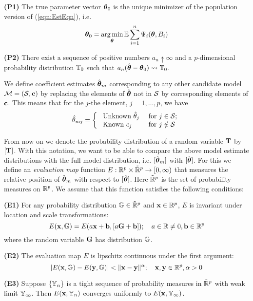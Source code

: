 \noindent\textbf{(P1)} The true parameter vector ${\boldsymbol{\theta}}_0$ is the unique minimizer of the population version of (\ref{eqn:EstEqn}), i.e.
%
\begin{align*}
{\boldsymbol{\theta}}_0 = \operatorname*{arg\,min}_{ {\boldsymbol{\theta}} } {\mathbb{E}} \sum_{i=1}^n \Psi_i ({\boldsymbol{\theta}}, B_i)
\end{align*}

\noindent\textbf{(P2)} There exist a sequence of positive numbers $a_n \uparrow \infty$ and a $p$-dimensional probability distribution ${\mathbb{T}}_0$ such that $a_n (\hat {{\boldsymbol{\theta}}} - {\boldsymbol{\theta}}_0) \leadsto {\mathbb{T}}_0$.
%

\noindent We define coefficient estimates $\hat {{\boldsymbol{\theta}}}_m$ corresponding to any other candidate model ${\cal{M}} = ({\cal{S}}, {\bf{c}})$ by replacing the elements of $\hat {{\boldsymbol{\theta}}}$ not in ${\cal{S}}$ by corresponding elements of ${\bf{c}}$. This means that for the $j$-the element, $j = 1, \ldots, p$, we have
%
$$
\hat \theta_{m j} = \left\{ \begin{array}{ll}
\text{ Unknown } \hat \theta_{j} & \text{ for } 
			j \in {\cal{S}}; \\
\text{ Known } c_{j} & \text{ for } j \notin {\cal{S}}
\end{array}
\right.
$$
%

From now on we denote the probability distribution of a random variable ${\mathbf{T}}$ by $[{\mathbf{T}}]$. With this notation, we want to be able to compare the above model estimate distributions with the full model distribution, i.e. $[\hat {{\boldsymbol{\theta}}}_m]$ with  $[\hat{{\boldsymbol{\theta}}}]$. For this we define an \textit{evaluation map} function $E: {\mathbb{R}}^p \times \tilde {{\mathbb{R}}}^p \rightarrow [0, \infty)$ that measures the relative position of $\hat {{\boldsymbol{\theta}}}_m$ with respect to $[\hat {{\boldsymbol{\theta}}}]$. Here $\tilde {{\mathbb{R}}}^p$ is the set of probability measures on ${\mathbb{R}}^p$. We assume that this function satisfies the following conditions:

\noindent\textbf{(E1)} For any probability distribution ${\mathbb{G}} \in \tilde {{\mathbb{R}}}^p$ and ${\bf{x}} \in {\mathbb{R}}^p$, $E$ is invariant under location and scale transformations:
%
$$
E( {\bf{x}}, {\mathbb{G}}) = E( a{\bf{x}} + {\bf{b}}, [a {\mathbf{G}} + {\bf{b}}]); \quad a \in {\mathbb{R}} \neq 0, {\bf{b}} \in {\mathbb{R}}^p
$$
%
where the random variable ${\mathbf{G}}$ has distribution ${\mathbb{G}}$.

\noindent\textbf{(E2)} The evaluation map $E$ is lipschitz continuous under the first argument:
%
$$
| E( {\bf{x}}, {\mathbb{G}}) - E( {\bf{y}}, {\mathbb{G}}) | < \| {\bf{x}} - {\bf{y}} \|^\alpha; \quad {\bf{x}}, {\bf{y}} \in {\mathbb{R}}^p, \alpha > 0
$$

\noindent\textbf{(E3)}
Suppose $\{ {\mathbb{Y}}_n \}$ is a tight sequence of probability measures in $\tilde {{\mathbb{R}}}^p$ with weak limit ${\mathbb{Y}}_\infty$. Then $E( {\bf{x}}, {\mathbb{Y}}_n)$ converges uniformly to $E({\bf{x}}, {\mathbb{Y}}_\infty)$.

